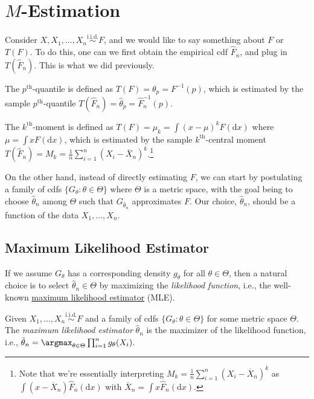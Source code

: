 \chapter{\(M\)-Estimation}
Consider \(X, X_1, \dots , X_n \overset{\text{i.i.d.} }{\sim } F\), and we would like to say something about \(F\) or \(T(F)\). To do this, one can we first obtain the empirical cdf \(\hat{F} _n\), and plug in \(T(\hat{F} _n)\). This is what we did previously.

\begin{eg}[Quantile]
	The \(p^{\text{th} }\)-quantile is defined as \(T(F) = \theta _p = F^{-1} (p)\), which is estimated by the sample \(p^{\text{th} }\)-quantile \(T(\hat{F} _n) = \hat{\theta} _p = \hat{F} _n ^{-1} (p)\).
\end{eg}

\begin{eg}[Moment]
	The \(k^{\text{th} }\)-moment is defined as \(T(F) = \mu _k = \int (x - \mu )^k F(\mathrm{d} x)\) where \(\mu = \int x F(\mathrm{d} x)\), which is estimated by the sample \(k^{\text{th} }\)-central moment \(T(\hat{F} _n) = M_k = \frac{1}{n} \sum_{i=1}^{n} (X_i - \overline{X} _n)^k\).\footnote{Note that we're essentially interpreting \(M_k = \frac{1}{n}\sum_{i=1}^{n} (X_i - \overline{X} _n)^k\) as \(\int (x - \overline{X} _n) \hat{F} _n(\mathrm{d} x)\) with \(\overline{X} _n = \int x \hat{F} _n(\mathrm{d} x)\).}
\end{eg}

On the other hand, instead of directly estimating \(F\), we can start by postulating a family of cdfs \(\{ G_\theta \colon \theta  \in \Theta \} \) where \(\Theta \) is a metric space, with the goal being to choose \(\hat{\theta} _n\) among \(\Theta \) such that \(G_{\hat{\theta} _n}\) approximates \(F\). Our choice, \(\hat{\theta} _n\), should be a function of the data \(X_1, \dots , X_n\).

\section{Maximum Likelihood Estimator}
If we assume \(G_\theta \) has a corresponding density \(g_\theta \) for all \(\theta \in \Theta \), then a natural choice is to select \(\hat{\theta} _n \in \Theta \) by maximizing the \emph{likelihood function}, i.e., the well-known \hyperref[def:MLE]{maximum likelihood estimator} (MLE).

\begin{definition}\label{def:MLE}
	Given \(X_1, \dots , X_n \overset{\text{i.i.d.} }{\sim } F\) and a family of cdfs \(\{ G_\theta \colon \theta \in \Theta \} \) for some metric space \(\Theta \). The \emph{maximum likelihood estimator} \(\hat{\theta} _n\) is the maximizer of the likelihood function, i.e., \(\hat{\theta} _n = \argmax_{\theta \in \Theta } \prod_{i=1}^{n} g_\theta (X_i)\).
\end{definition}

